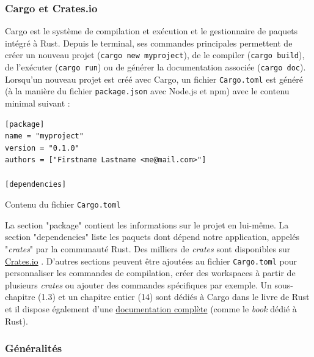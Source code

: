 \subsubsection{Cargo et Crates.io}\label{cargo_crates}
Cargo est le système de compilation et exécution et le gestionnaire de paquets intégré à Rust.
Depuis le terminal, ses commandes principales permettent de créer un nouveau projet 
(\texttt{cargo new myproject}), de le compiler (\texttt{cargo build}), de 
l'exécuter (\texttt{cargo run}) ou de générer la documentation associée 
(\texttt{cargo doc}). Lorsqu'un nouveau projet est créé avec Cargo, un fichier 
\texttt{Cargo.toml} est généré (à la manière du fichier \texttt{package.json} 
avec Node.js et npm) avec le contenu minimal suivant :
\bigbreak
\begin{code}
    \begin{verbatim}
[package]
name = "myproject"
version = "0.1.0"
authors = ["Firstname Lastname <me@mail.com>"]

[dependencies]
    \end{verbatim}
    \caption{Contenu du fichier \texttt{Cargo.toml}}
\end{code}
\bigbreak
La section "package" contient les informations sur le projet en lui-même. La section "dependencies" 
liste les paquets dont dépend notre application, appelés "\textit{crates}" par la communauté Rust. 
Des milliers de \textit{crates} sont disponibles sur \href{https://crates.io}{Crates.io} \cite{ref33}. 
D'autres sections peuvent être ajoutées au fichier \texttt{Cargo.toml} pour personnaliser 
les commandes de compilation, créer des workspaces à partir de plusieurs \textit{crates} ou ajouter 
des commandes spécifiques par exemple.
Un sous-chapitre (1.3) et un chapitre entier (14) sont dédiés à Cargo dans le livre de Rust \cite{ref0} 
et il dispose également d'une \href{https://doc.rust-lang.org/cargo/}{documentation complète} 
\cite{ref35} (comme le \textit{book} dédié à Rust).

\subsubsection{Généralités}


